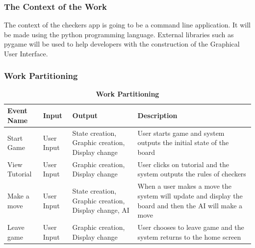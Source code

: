 \documentclass[12pt, titlepage]{article}
\begin{document}
\subsubsection{The Context of the Work}
The context of the checkers app is going to be a command line application. It will be made using the python programming language. External libraries such as pygame will be used to help developers with the construction of the Graphical User Interface.
\subsubsection{Work Partitioning}

\begin{table}[h!]
    \begin{center}
	\caption{\bf Work Partitioning}
	\begin{adjustwidth}{-1.5cm}{}
	\begin{tabularx}{1.2\textwidth}{p{2.5cm}p{2.1cm}p{3.4cm}X}
		\toprule {\bf Event Name}  & {\bf Input} & {\bf Output} & {\bf Description} \\
		\midrule
		Start Game & User Input & State creation, Graphic creation, Display change & User starts game and system outputs the initial state of the board\\
		View Tutorial & User Input & Graphic creation, Display change & User clicks on tutorial and the system outputs the rules of checkers\\
		Make a move & User Input & State creation, Graphic creation, Display change, AI & When a user makes a move the system will update and display the board and then the AI will make a move \\
		Leave game & User Input & Graphic creation, Display change & User chooses to leave game and the system returns to the home screen\\
		\bottomrule
	\end{tabularx}
	\end{adjustwidth}
	\end{center}
\end{table}
\end{document}
